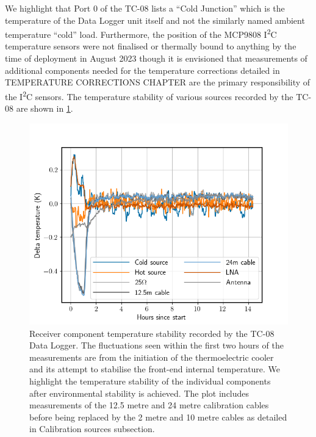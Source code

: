 We highlight that Port 0 of the TC-08 lists a “Cold Junction” which is the temperature of the Data Logger unit itself and not the similarly named ambient temperature “cold” load. Furthermore, the position of the MCP9808 I\textsuperscript{2}C temperature sensors were not finalised or thermally bound to anything by the time of deployment in August 2023 though it is envisioned that measurements of additional components needed for the temperature corrections detailed in TEMPERATURE CORRECTIONS CHAPTER are the primary responsibility of the I\textsuperscript{2}C sensors. The temperature stability of various sources recorded by the TC-08 are shown in \cref{fig:temperature}.
\begin{figure}
    \centering
    \includegraphics[scale=0.6]{temperature}
    \caption{Receiver component temperature stability recorded by the TC-08 Data Logger. The fluctuations seen within the first two hours of the measurements are from the initiation of the thermoelectric cooler and its attempt to stabilise the front-end internal temperature. We highlight the temperature stability of the individual components after environmental stability is achieved. The plot includes measurements of the 12.5 metre and 24 metre calibration cables before being replaced by the 2 metre and 10 metre cables as detailed in Calibration sources subsection.}
    \label{fig:temperature}
\end{figure}


